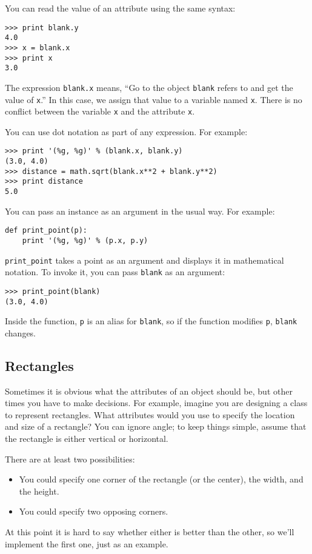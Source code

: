 \documentclass{article}
\begin{document}
You can read the value of an attribute using the same syntax:
\begin{lstlisting}
>>> print blank.y
4.0
>>> x = blank.x
>>> print x
3.0
\end{lstlisting}
The expression \verb|blank.x| means, ``Go to the object \verb|blank| refers
to and get the value of \verb|x|.'' In this case, we assign that value to a
variable named \verb|x|.  There is no conflict between the variable
\verb|x| and the attribute \verb|x|.

You can use dot notation as part of any expression. For example:
\begin{verbatim}
>>> print '(%g, %g)' % (blank.x, blank.y)
(3.0, 4.0)
>>> distance = math.sqrt(blank.x**2 + blank.y**2)
>>> print distance
5.0
\end{verbatim}
You can pass an instance as an argument in the usual way. For example:
\begin{verbatim}
def print_point(p):
    print '(%g, %g)' % (p.x, p.y)
\end{verbatim}
\verb|print_point| takes a point as an argument and displays it in
mathematical notation. To invoke it, you can pass \verb|blank| as an
argument:
\begin{lstlisting}
>>> print_point(blank)
(3.0, 4.0)
\end{lstlisting}
Inside the function, \verb|p| is an alias for \verb|blank|, so if the
function modifies \verb|p|, \verb|blank| changes.
\subsection{Rectangles}
Sometimes it is obvious what the attributes of an object should be, but
other times you have to make decisions. For example, imagine you are
designing a class to represent rectangles. What attributes would you use to
specify the location and size of a rectangle? You can ignore angle; to keep
things simple, assume that the rectangle is either vertical or horizontal.

There are at least two possibilities:
\begin{itemize}
    \item You could specify one corner of the rectangle (or the center),
        the width, and the height.
    \item You could specify two opposing corners.
\end{itemize}
At this point it is hard to say whether either is better than the other, so
we’ll implement the first one, just as an example.
\end{document}

